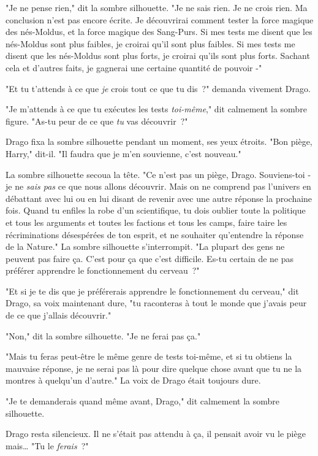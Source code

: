 "Je ne pense rien," dit la sombre silhouette. "Je ne sais rien. Je ne crois rien. Ma conclusion n'est pas encore écrite. Je découvrirai comment tester la force magique des nés-Moldus, et la force magique des Sang-Purs. Si mes tests me disent que les nés-Moldus sont plus faibles, je croirai qu'il sont plus faibles. Si mes tests me disent que les nés-Moldus sont plus forts, je croirai qu'ils sont plus forts. Sachant cela et d'autres faits, je gagnerai une certaine quantité de pouvoir -"

"Et tu t'attends à ce que \emph{je} crois tout ce que tu dis~?" demanda vivement Drago.

"Je m'attends à ce que tu exécutes les tests \emph{toi-même}," dit calmement la sombre figure. "As-tu peur de ce que \emph{tu} vas découvrir~?"

Drago fixa la sombre silhouette pendant un moment, ses yeux étroits. "Bon piège, Harry," dit-il. "Il faudra que je m'en souvienne, c'est nouveau."

La sombre silhouette secoua la tête. "Ce n'est pas un piège, Drago. Souviens-toi - je ne \emph{sais pas} ce que nous allons découvrir. Mais on ne comprend pas l'univers en débattant avec lui ou en lui disant de revenir avec une autre réponse la prochaine fois. Quand tu enfiles la robe d'un scientifique, tu dois oublier toute la politique et tous les arguments et toutes les factions et tous les camps, faire taire les récriminations désespérées de ton esprit, et ne souhaiter qu'entendre la réponse de la Nature." La sombre silhouette s'interrompit. "La plupart des gens ne peuvent pas faire ça. C'est pour ça que c'est difficile. Es-tu certain de ne pas préférer apprendre le fonctionnement du cerveau~?"

"Et si je te dis que je préférerais apprendre le fonctionnement du cerveau," dit Drago, sa voix maintenant dure, "tu raconteras à tout le monde que j'avais peur de ce que j'allais découvrir."

"Non," dit la sombre silhouette. "Je ne ferai pas ça."

"Mais tu feras peut-être le même genre de tests toi-même, et si tu obtiens la mauvaise réponse, je ne serai pas là pour dire quelque chose avant que tu ne la montres à quelqu'un d'autre." La voix de Drago était toujours dure.

"Je te demanderais quand même avant, Drago," dit calmement la sombre silhouette.

Drago resta silencieux. Il ne s'était pas attendu à ça, il pensait avoir vu le piège mais… "Tu le \emph{ferais}~?"


